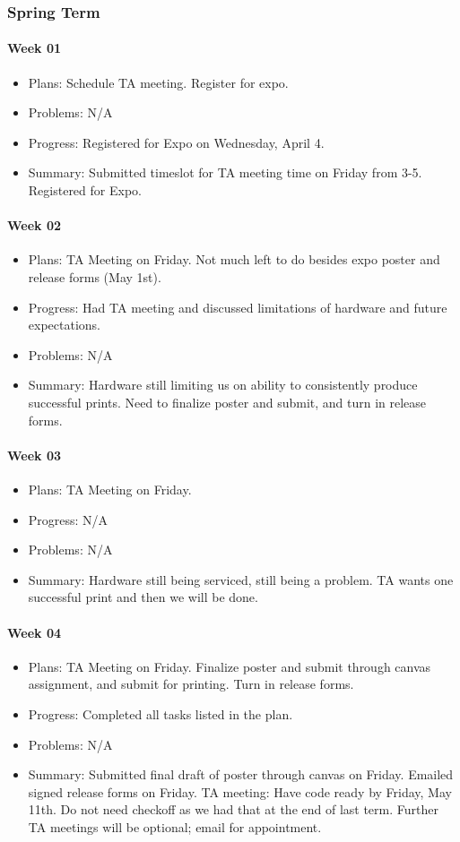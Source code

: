 \subsubsection{Spring Term}
\paragraph{Week 01}
\begin{itemize}
\item Plans: Schedule TA meeting.
Register for expo.
\item Problems: N/A
\item Progress: Registered for Expo on Wednesday, April 4.
\item Summary: Submitted timeslot for TA meeting time on Friday from 3-5. 
Registered for Expo.
\end{itemize}
\paragraph{Week 02}
\begin{itemize}
\item Plans: TA Meeting on Friday.
Not much left to do besides expo poster and release forms (May 1st).
\item Progress: Had TA meeting and discussed limitations of hardware and future expectations.
\item Problems: N/A
\item Summary: Hardware still limiting us on ability to consistently produce successful prints. 
Need to finalize poster and submit, and turn in release forms.
\end{itemize}
\paragraph{Week 03}
\begin{itemize}
\item Plans: TA Meeting on Friday.
\item Progress: N/A
\item Problems: N/A
\item Summary: Hardware still being serviced, still being a problem. 
TA wants one successful print and then we will be done.
\end{itemize}
\paragraph{Week 04}
\begin{itemize}
\item Plans: TA Meeting on Friday.
Finalize poster and submit through canvas assignment, and submit for printing. 
Turn in release forms.
\item Progress: Completed all tasks listed in the plan.
\item Problems: N/A
\item Summary: Submitted final draft of poster through canvas on Friday. 
Emailed signed release forms on Friday.
TA meeting: Have code ready by Friday, May 11th. 
Do not need checkoff as we had that at the end of last term. 
Further TA meetings will be optional; email for appointment.
\end{itemize}
